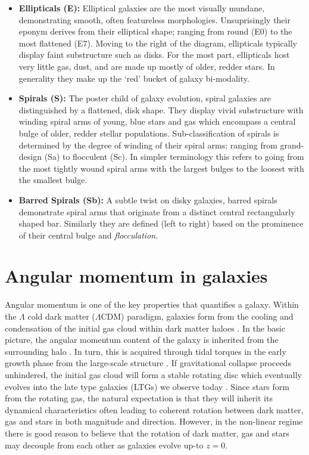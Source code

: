 \begin{itemize}
    \item \textbf{Ellipticals (E):} Elliptical galaxies are the most visually mundane, demonstrating smooth, often featureless morphologies. Unsuprisingly their eponym derives from their elliptical shape; ranging from round (E0) to the most flattened (E7). Moving to the right of the diagram, ellipticals typically display faint substructure such as disks. For the most part, ellipticals host very little gas, dust, and are made up mostly of older, redder stars. In generality they make up the `red' bucket of galaxy bi-modality.
    
    \item \textbf{Spirals (S):} The poster child of galaxy evolution, spiral galaxies are distinguished by a flattened, disk shape. They display vivid substructure with winding spiral arms of young, blue stars and gas which encompass a central bulge of older, redder stellar populations. Sub-classification of spirals is determined by the degree of winding of their spiral arms; ranging from grand-design (Sa) to flocculent (Sc). In simpler terminology this refers to going from the most tightly wound spiral arms with the largest bulges to the loosest with the smallest bulge.
    
    \item \textbf{Barred Spirals (Sb):} A subtle twist on disky galaxies, barred spirals demonstrate spiral arms that originate from a distinct central rectangularly shaped bar. Similarly they are defined (left to right) based on the prominence of their central bulge and \textit{flocculation}.
    
\end{itemize}

\section{Angular momentum in galaxies} \label{sec:ang_mom_intro}
 Angular momentum is one of the key properties that quantifies a galaxy. Within the $\Lambda$ cold dark matter ($\Lambda$CDM) paradigm, galaxies form from the cooling and condensation of the initial gas cloud within dark matter haloes \citep{white1978, mo1998}. In the basic picture, the angular momentum content of the galaxy is inherited from the surrounding halo \citep[][]{fall1980}. In turn, this is acquired through tidal torques in the early growth phase from the large-scale structure \citep[e.g.][]{peebles1969, Doroshkevich1970}. If gravitational collapse proceeds unhindered, the initial gas cloud will form a stable rotating disc which eventually evolves into the late type galaxies (LTGs) we observe today \citep{white1978}. Since stars form from the rotating gas, the natural expectation is that they will inherit its dynamical characteristics often leading to coherent rotation between dark matter, gas and stars in both magnitude and direction. However, in the non-linear regime there is good reason to believe that the rotation of dark matter, gas and stars may decouple from each other as galaxies evolve up-to $z=0$. 

